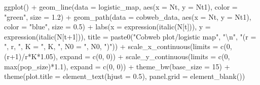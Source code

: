 \documentclass[
]{book}
\newenvironment{Shaded}{\begin{snugshade}}{\end{snugshade}}
\newcommand{\AttributeTok}[1]{\textcolor[rgb]{0.77,0.63,0.00}{#1}}
\newcommand{\DecValTok}[1]{\textcolor[rgb]{0.00,0.00,0.81}{#1}}
\newcommand{\FloatTok}[1]{\textcolor[rgb]{0.00,0.00,0.81}{#1}}
\newcommand{\FunctionTok}[1]{\textcolor[rgb]{0.00,0.00,0.00}{#1}}
\newcommand{\NormalTok}[1]{#1}
\newcommand{\SpecialCharTok}[1]{\textcolor[rgb]{0.00,0.00,0.00}{#1}}
\newcommand{\StringTok}[1]{\textcolor[rgb]{0.31,0.60,0.02}{#1}}
\begin{document}
\begin{Shaded}
\begin{Highlighting}[]
\FunctionTok{ggplot}\NormalTok{() }\SpecialCharTok{+} 
  \FunctionTok{geom\_line}\NormalTok{(}\AttributeTok{data =}\NormalTok{ logistic\_map, }\FunctionTok{aes}\NormalTok{(}\AttributeTok{x =}\NormalTok{ Nt, }\AttributeTok{y =}\NormalTok{ Nt1), }\AttributeTok{color =} \StringTok{"green"}\NormalTok{, }\AttributeTok{size =} \FloatTok{1.2}\NormalTok{) }\SpecialCharTok{+} 
  \FunctionTok{geom\_path}\NormalTok{(}\AttributeTok{data =}\NormalTok{ cobweb\_data, }\FunctionTok{aes}\NormalTok{(}\AttributeTok{x =}\NormalTok{ Nt, }\AttributeTok{y =}\NormalTok{ Nt1), }\AttributeTok{color =} \StringTok{"blue"}\NormalTok{, }\AttributeTok{size =} \FloatTok{0.5}\NormalTok{) }\SpecialCharTok{+} 
  \FunctionTok{labs}\NormalTok{(}\AttributeTok{x =} \FunctionTok{expression}\NormalTok{(}\FunctionTok{italic}\NormalTok{(N[t])),}
       \AttributeTok{y =} \FunctionTok{expression}\NormalTok{(}\FunctionTok{italic}\NormalTok{(N[t}\SpecialCharTok{+}\DecValTok{1}\NormalTok{])), }
       \AttributeTok{title =} \FunctionTok{paste0}\NormalTok{(}\StringTok{"Cobweb plot/logistic map"}\NormalTok{, }\StringTok{"}\SpecialCharTok{\textbackslash{}n}\StringTok{"}\NormalTok{, }\StringTok{"(r = "}\NormalTok{, r, }\StringTok{", K = "}\NormalTok{, K, }\StringTok{", N0 = "}\NormalTok{, N0, }\StringTok{")"}\NormalTok{)) }\SpecialCharTok{+} 
  \FunctionTok{scale\_x\_continuous}\NormalTok{(}\AttributeTok{limits =} \FunctionTok{c}\NormalTok{(}\DecValTok{0}\NormalTok{, (r}\SpecialCharTok{+}\DecValTok{1}\NormalTok{)}\SpecialCharTok{/}\NormalTok{r}\SpecialCharTok{*}\NormalTok{K}\SpecialCharTok{*}\FloatTok{1.05}\NormalTok{), }\AttributeTok{expand =} \FunctionTok{c}\NormalTok{(}\DecValTok{0}\NormalTok{, }\DecValTok{0}\NormalTok{)) }\SpecialCharTok{+} 
  \FunctionTok{scale\_y\_continuous}\NormalTok{(}\AttributeTok{limits =} \FunctionTok{c}\NormalTok{(}\DecValTok{0}\NormalTok{, }\FunctionTok{max}\NormalTok{(pop\_size)}\SpecialCharTok{*}\FloatTok{1.1}\NormalTok{), }\AttributeTok{expand =} \FunctionTok{c}\NormalTok{(}\DecValTok{0}\NormalTok{, }\DecValTok{0}\NormalTok{)) }\SpecialCharTok{+} 
  \FunctionTok{theme\_bw}\NormalTok{(}\AttributeTok{base\_size =} \DecValTok{15}\NormalTok{) }\SpecialCharTok{+}
  \FunctionTok{theme}\NormalTok{(}\AttributeTok{plot.title =} \FunctionTok{element\_text}\NormalTok{(}\AttributeTok{hjust =} \FloatTok{0.5}\NormalTok{),}
        \AttributeTok{panel.grid =} \FunctionTok{element\_blank}\NormalTok{())}
\end{Highlighting}
\end{Shaded}
\end{document}
